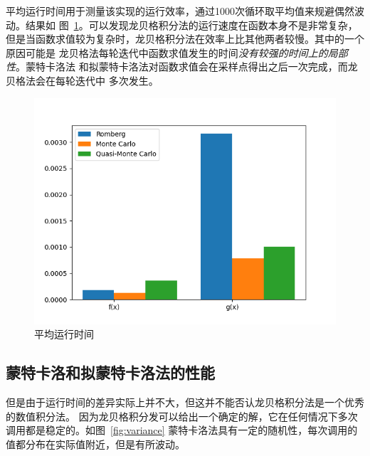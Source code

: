 \documentclass[a4paper,twoside]{article}
\begin{document}
\begin{spacing}{1.2}
平均运行时间用于测量该实现的运行效率，通过1000次循环取平均值来规避偶然波动。结果如
图~\ref{fig:rubtimeaverage}。可以发现龙贝格积分法的运行速度在函数本身不是非常复杂，
但是当函数求值较为复杂时，龙贝格积分法在效率上比其他两者较慢。其中的一个原因可能是
龙贝格法每轮迭代中函数求值发生的时间\emph{没有较强的时间上的局部性}。蒙特卡洛法
和拟蒙特卡洛法对函数求值会在采样点得出之后一次完成，而龙贝格法会在每轮迭代中
多次发生。

\begin{figure}[htbp]
	\centering
	\label{fig:rubtimeaverage}
	\includegraphics[width=0.5\linewidth]{runtime.png}
	\caption{平均运行时间}
\end{figure}

\subsection{蒙特卡洛和拟蒙特卡洛法的性能}

但是由于运行时间的差异实际上并不大，但这并不能否认龙贝格积分法是一个优秀的数值积分法。
因为龙贝格积分发可以给出一个确定的解，它在任何情况下多次调用都是稳定的。如图~\ref{fig:variance}
蒙特卡洛法具有一定的随机性，每次调用的值都分布在实际值附近，但是有所波动。


\end{spacing}
\end{document}
